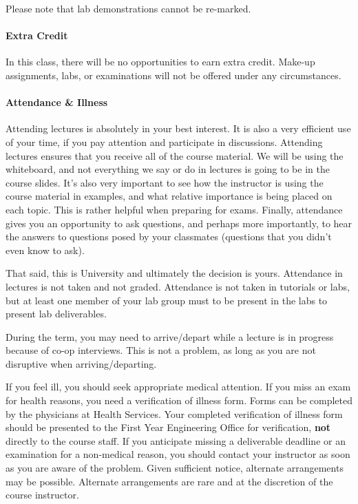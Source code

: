 \documentclass[letterpaper,10pt]{article}
\begin{document}
Please note that lab demonstrations cannot be re-marked.

\paragraph{Extra Credit}
In this class, there will be no opportunities to earn extra credit. Make-up assignments, labs, or examinations will not be offered under any circumstances.

\paragraph{Attendance \& Illness}

Attending lectures is absolutely in your best interest. It is also a very efficient use of your time, if you pay attention and participate in discussions. Attending lectures ensures that you receive all of the course material. We will be using the whiteboard, and not everything we say or do in lectures is going to be in the course slides. It's also very important to see how the instructor is using the course material in examples, and what relative importance is being placed on each topic. This is rather helpful when preparing for exams. Finally, attendance gives you an opportunity to ask questions, and perhaps more importantly, to hear the answers to questions posed by your classmates (questions that you didn't even know to ask).

That said, this is University and ultimately the decision is yours. Attendance in lectures is not taken and not graded. Attendance is not taken in tutorials or labs, but at least one member of your lab group must to be present in the labs to present lab deliverables.

During the term, you may need to arrive/depart while a lecture is in progress because of co-op interviews. This is not a problem, as long as you are not disruptive when arriving/departing.

If you feel ill, you should seek appropriate medical attention. If you miss an exam for health reasons, you need a verification of illness form. Forms can be completed by the physicians at Health Services. Your completed verification of illness form should be presented to the First Year Engineering Office for verification, \textbf{not} directly to the course staff. If you anticipate missing a deliverable deadline or an examination for a non-medical reason, you should contact your instructor as soon as you are aware of the problem. Given sufficient notice, alternate arrangements may be possible. Alternate arrangements are rare and at the discretion of the course instructor.
\end{document}
